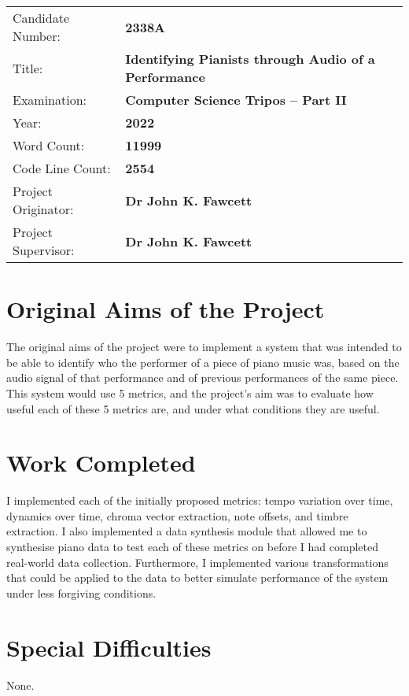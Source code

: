 \documentclass[crop=false]{standalone}
\begin{document}
  \begin{tabular}{ll}
    Candidate Number: &\textbf{2338A} \\
    Title: &\textbf{Identifying Pianists through Audio of a Performance} \\
    Examination: &\textbf{Computer Science Tripos -- Part II} \\
    Year: &\textbf{2022} \\
    Word Count: &\textbf{11999}\footnotemark \\
    Code Line Count: &\textbf{2554}\footnotemark \\
    Project Originator: &\textbf{Dr John K. Fawcett} \\
    Project Supervisor: &\textbf{Dr John K. Fawcett}
  \end{tabular}

  \section*{Original Aims of the Project}

  The original aims of the project were to implement a system that was intended to be able to identify who the performer of a piece of piano music was, based on the audio signal of that performance and of previous performances of the same piece. This system would use 5 metrics, and the project's aim was to evaluate how useful each of these 5 metrics are, and under what conditions they are useful.

  \section*{Work Completed}
  I implemented each of the initially proposed metrics: tempo variation over time, dynamics over time, chroma vector extraction, note offsets, and timbre extraction. I also implemented a data synthesis module that allowed me to synthesise piano data to test each of these metrics on before I had completed real-world data collection. Furthermore, I implemented various transformations that could be applied to the data to better simulate performance of the system under less forgiving conditions.

  \section*{Special Difficulties}
  None.

\end{document}
